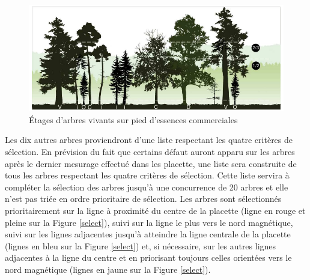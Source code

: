 \documentclass[letterpaper, 12pt]{article}
\begin{document}
\begin{onehalfspace}
\vspace{12pt}

\begin{figure}[H]
	\centering
	\includegraphics[width=15cm]{etages}
	\caption{Étages d’arbres  vivants sur pied d'essences commerciales}
	\label{etages}
\end{figure}

\vspace{12pt}

Les dix autres arbres proviendront d'une liste respectant les quatre critères de sélection. En prévision du fait que certains défaut auront apparu sur les arbres après le dernier mesurage effectué dans les placette, une liste sera construite de tous les arbres respectant les quatre critères de sélection.
Cette liste servira à compléter la sélection des arbres jusqu’à une concurrence de 20 arbres et elle n’est pas triée en ordre prioritaire de sélection. Les arbres sont sélectionnés prioritairement sur la ligne à proximité du centre de la placette (ligne en rouge et pleine sur la Figure \ref{select}), suivi sur la ligne le plus vers le nord magnétique, suivi sur les lignes adjacentes jusqu’à atteindre la ligne centrale de la placette  (lignes en bleu sur  la Figure \ref{select}) et, si nécessaire, sur les autres lignes adjacentes à la ligne du centre et en priorisant toujours celles orientées vers le nord magnétique (lignes en jaune sur la Figure \ref{select}).

\vspace{12pt}


\end{onehalfspace}
\end{document}
